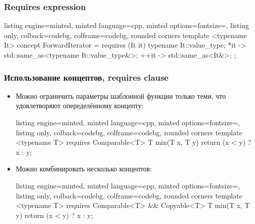 \documentclass[10pt]{beamer}
\begin{document}
\begin{frame}[fragile]
\frametitle{Requires expression}
\begin{itemize}
\begin{tcblisting}{listing engine=minted, minted language=cpp, minted options={fontsize=\scriptsize}, listing only, colback=codebg, colframe=codebg, rounded corners}
template <typename It>
concept ForwardIterator = requires (It it) {
  typename It::value_type;
  { *it } -> std::same_as<typename It::value_type&>;
  { ++it } -> std::same_as<It&>;
};
\end{tcblisting}
\end{itemize}
\end{frame}

\begin{frame}[fragile]
\frametitle{Использование концептов, requires clause}
\begin{itemize}
\item Можно ограничить параметры шаблонной функции только теми, что удовлетворяют опеределённому концепту:
\begin{tcblisting}{listing engine=minted, minted language=cpp, minted options={fontsize=\scriptsize}, listing only, colback=codebg, colframe=codebg, rounded corners}
template <typename T>
requires Comparable<T>
T min(T x, T y) {
  return (x < y) ? x : y;
}
\end{tcblisting}
\pause
\item Можно комбинировать несколько концептов:
\begin{tcblisting}{listing engine=minted, minted language=cpp, minted options={fontsize=\scriptsize}, listing only, colback=codebg, colframe=codebg, rounded corners}
template <typename T>
requires Comparable<T> && Copyable<T>
T min(T x, T y) {
  return (x < y) ? x : y;
}
\end{tcblisting}
\end{itemize}
\end{frame}
\end{document}
